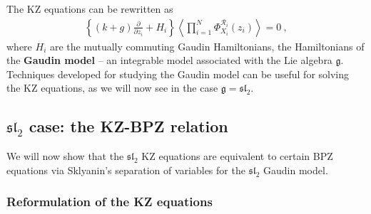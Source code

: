 \documentclass[12pt, a4paper, notitlepage, twoside]{report}
\numberwithin{equation}{section}
\theoremstyle{break}
\begin{document}
The KZ equations can be rewritten as 
\begin{align}
 \left\{(k+g){\frac{\partial}{\partial z_i}} + H_i \right\}\left\langle \prod_{i=1}^N \Phi^{\mathcal{R}_i}_{X_i}(z_i)\right\rangle   = 0 \ ,
\label{phz}
\end{align}
where $H_i$ are the mutually commuting Gaudin Hamiltonians, the Hamiltonians of the \textbf{\boldmath Gaudin model} -- an integrable model associated with the Lie algebra $\mathfrak{g}$.
Techniques developed for studying the Gaudin model can be useful for solving the KZ equations, as we will now see in the case $\mathfrak{g} = \mathfrak{sl}_2$. 


\subsection{\texorpdfstring{$\mathfrak{sl}_2$}{sl2} case: the KZ-BPZ relation} \label{seckzbpz}

We will now show that the $\mathfrak{sl}_2$ KZ equations are equivalent to certain BPZ equations via Sklyanin's separation of variables for the $\mathfrak{sl}_2$ Gaudin model. 

\subsubsection{Reformulation of the KZ equations}
\end{document}
